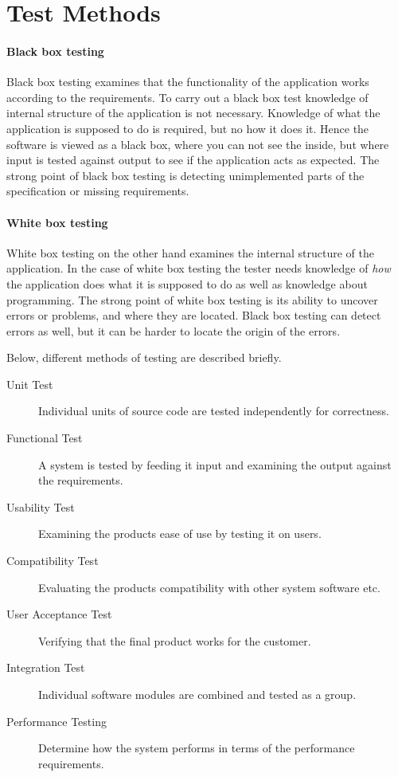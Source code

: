 \section{Test Methods}

\paragraph{Black box testing}

Black box testing examines that the functionality of the application works according to the requirements. To carry out a black box test knowledge of internal structure of the application is not necessary. Knowledge of what the application is supposed to do is required, but no how it does it. Hence the software is viewed as a black box, where you can not see the inside, but where input is tested against output to see if the application acts as expected. The strong point of black box testing is detecting unimplemented parts of the specification or missing requirements.

\paragraph{White box testing}

White box testing on the other hand examines the internal structure of the application. In the case of white box testing the tester needs knowledge of \emph{how} the application does what it is supposed to do as well as knowledge about programming. The strong point of white box testing is its ability to uncover errors or problems, and where they are located. Black box testing can detect errors as well, but it can be harder to locate the origin of the errors.

Below, different methods of testing are described briefly.

\begin{description}
  \item[Unit Test] Individual units of source code are tested independently for correctness.
  \item[Functional Test] A system is tested by feeding it input and examining the output against the requirements.
  \item[Usability Test] Examining the products ease of use by testing it on users.
  \item[Compatibility Test] Evaluating the products compatibility with other system software etc.
  \item[User Acceptance Test] Verifying that the final product works for the customer.
  \item[Integration Test] Individual software modules are combined and tested as a group.
  \item[Performance Testing] Determine how the system performs in terms of the performance requirements.
\end{description}